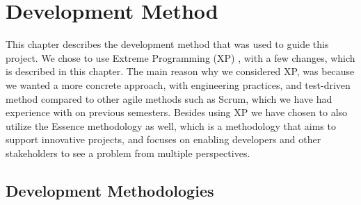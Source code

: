 
\chapter{Development Method}
\label{cha:development_method}

This chapter describes the development method that was used to guide this project. We chose to use Extreme Programming (XP) \parencite{xp}, with a few changes, which is described in this chapter. The main reason why we considered XP, was because we wanted a more concrete approach, with engineering practices, and test-driven method compared to other agile methods such as Scrum, which we have had experience with on previous semesters. Besides using XP we have chosen to also utilize the Essence methodology \parencite{essence_book} as well, which is a methodology that aims to support innovative projects, and focuses on enabling developers and other stakeholders to see a problem from multiple perspectives. 

\section{Development Methodologies}
\label{sec:development_methodologies}

